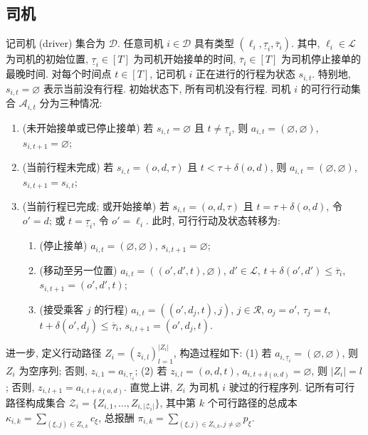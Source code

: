 \documentclass[10pt,twocolumn]{article}
\begin{document}
\subsection{司机}

记司机 (driver) 集合为 $\mathcal{D}$. 任意司机 $i\in\mathcal{D}$ 具有类型 $(\ell_i, \underline{\tau}_i, \overline{\tau}_i)$. 其中, $\ell_i\in \mathcal{L}$ 为司机的初始位置, $\underline{\tau}_i\in [T]$ 为司机开始接单的时间, $\overline{\tau}_i\in [T]$ 为司机停止接单的最晚时间. 对每个时间点 $t\in [T]$, 记司机 $i$ 正在进行的行程为状态 $s_{i,t}$. 特别地, $s_{i,t} = \varnothing$ 表示当前没有行程. 初始状态下, 所有司机没有行程. 司机 $i$ 的可行行动集合 $\mathcal{A}_{i,t}$ 分为三种情况:

\begin{enumerate}[label=(\arabic*)]
  \item (未开始接单或已停止接单) 若 $s_{i,t} = \varnothing$ 且 $t \ne \underline{\tau}_i$, 则 $a_{i,t} = (\varnothing, \varnothing)$, $s_{i, t+1} = \varnothing$;
  \item (当前行程未完成) 若 $s_{i,t} = (o, d, \tau)$ 且 $t < \tau + \delta(o, d)$, 则 $a_{i,t} = (\varnothing, \varnothing)$, $s_{i, t+1} = s_{i,t}$;
  \item (当前行程已完成; 或开始接单) 若 $s_{i,t} = (o, d, \tau)$ 且 $t = \tau + \delta(o, d)$, 令 $o' = d$; 或 $t = \underline{\tau}_i$, 令 $o' = \ell_i$. 此时, 可行行动及状态转移为:
    \begin{enumerate}
      \item (停止接单) $a_{i, t} = (\varnothing, \varnothing)$, $s_{i, t+1} = \varnothing$;
      \item (移动至另一位置) $a_{i, t} = ((o', d', t), \varnothing)$, $d'\in \mathcal{L}$, $t + \delta(o', d') \le \overline{\tau}_i$, $s_{i, t+1} = (o', d', t)$;
      \item (接受乘客 $j$ 的行程) $a_{i, t} = ((o', d_j, t), j)$, $j\in \mathcal{R}$, $o_j = o'$, $\tau_j = t$, $t + \delta(o', d_j) \le \overline{\tau}_i$, $s_{i, t+1} = (o', d_j, t)$.
    \end{enumerate}
\end{enumerate}

进一步, 定义行动路径 $Z_{i} = (z_{i,l})^{|Z_{i}|}_{l=1}$, 构造过程如下: (1) 若 $a_{i,\underline{\tau}_i} = (\varnothing, \varnothing)$, 则 $Z_{i}$ 为空序列; 否则, $z_{i, 1} = a_{i,\underline{\tau}_i}$; (2) 若 $z_{i, l} = (o, d, t)$, $a_{i, t+\delta(o, d)} = \varnothing$, 则 $|Z_{i}| = l$; 否则, $z_{i, l+1} = a_{i, t+\delta(o, d)}$. 直觉上讲, $Z_{i}$ 为司机 $i$ 驶过的行程序列. 记所有可行路径构成集合 $\mathcal{Z}_i = \{Z_{i,1}, \dots, Z_{i,|\mathcal{Z}_i|}\}$, 其中第 $k$ 个可行路径的总成本 $\kappa_{i,k} = \sum_{(\xi, j)\in Z_{i,k}} c_\xi$, 总报酬 $\pi_{i,k} = \sum_{(\xi, j)\in Z_{i,k}, j\ne \varnothing} p_\xi$.
\end{document}
